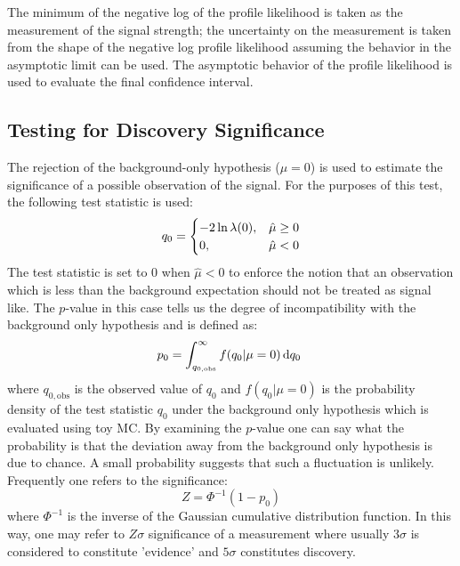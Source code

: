 The minimum of the negative log of the profile likelihood 
is taken as the measurement of the signal strength; 
the uncertainty on the measurement is taken from the shape of the 
negative log profile likelihood assuming the behavior in the asymptotic
limit can be used.  The asymptotic behavior of the profile likelihood 
is used to evaluate the final confidence interval. 


\subsection{Testing for Discovery Significance}
The rejection of the background-only hypothesis ($\mu = 0$) is used 
to estimate the significance of a possible observation of the signal.
For the purposes of this test, the following test 
statistic is used:
\begin{equation}
q_{0} = 
\begin{cases}
\hfill -2 \ln \lambda(0),\hfill & \hat{\mu} \geq 0 \\
0,\hfill & \hat{\mu} < 0
\end{cases}
\label{eq:q0}
\end{equation}
The test statistic is set to $0$ when $\hat{\mu} < 0$ to enforce
the notion that an observation which is less than the background
expectation should not be treated as signal like. The $p$-value in this case
tells us the degree of incompatibility with the background only hypothesis
and is defined as:
\begin{equation}
p_0=\int^{\infty }_{q_{0,\textrm{obs}}} f(q_0|\mu=0) \mathop{}\!\mathrm{d}q_0~
\label{eq:pvalue}
\end{equation}
where $q_{0,\textrm{obs}}$ is the observed value of $q_0$ and 
$f(q_0|\mu=0)$ is the probability density of the test statistic $q_0$ under
the background only hypothesis which is evaluated using toy MC. %
By examining the $p$-value one can say what the probability is 
that the deviation away from the background only hypothesis is due
to chance. A small probability suggests that such a fluctuation is
unlikely. Frequently one refers to the significance:
\begin{equation}
Z = \Phi^{-1}(1-p_0)
\label{eq:significance}
\end{equation}
where $\Phi^{-1}$ is the inverse of the Gaussian cumulative distribution 
function.
In this way, one may refer to $Z\sigma$ significance of a measurement 
where usually
$3\sigma$ is considered to constitute 'evidence' and $5\sigma$ constitutes
discovery.

